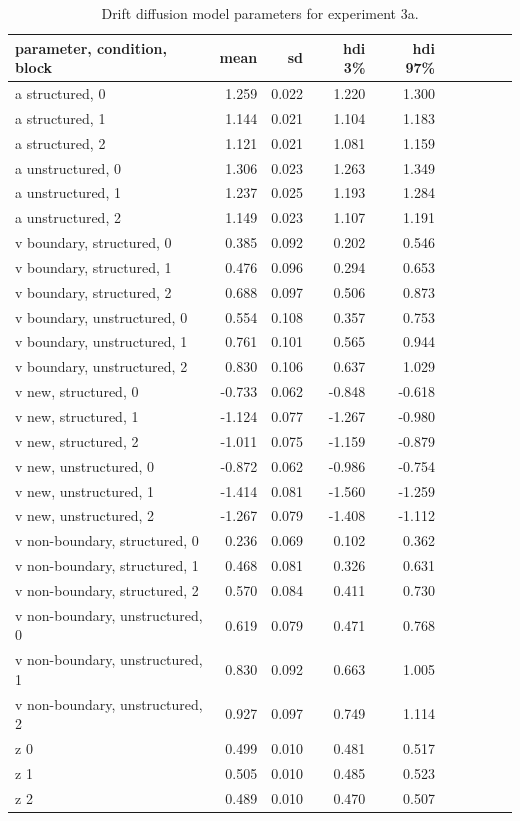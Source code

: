 \begin{table}[H]
    \centering
    \caption{Drift diffusion model parameters for experiment 3a.}
    \label{tab:exp3-ddm-params}
    \begin{tabular}{lrrrrrrrrr}
        \toprule
        parameter, condition, block & mean & sd & hdi 3\% & hdi 97\% \\
        \midrule
        a structured, 0 & 1.259 & 0.022 & 1.220 & 1.300 \\
        a structured, 1 & 1.144 & 0.021 & 1.104 & 1.183 \\
        a structured, 2 & 1.121 & 0.021 & 1.081 & 1.159 \\
        a unstructured, 0 & 1.306 & 0.023 & 1.263 & 1.349 \\
        a unstructured, 1 & 1.237 & 0.025 & 1.193 & 1.284 \\
        a unstructured, 2 & 1.149 & 0.023 & 1.107 & 1.191 \\
        v boundary, structured, 0 & 0.385 & 0.092 & 0.202 & 0.546 \\
        v boundary, structured, 1 & 0.476 & 0.096 & 0.294 & 0.653 \\
        v boundary, structured, 2 & 0.688 & 0.097 & 0.506 & 0.873 \\
        v boundary, unstructured, 0 & 0.554 & 0.108 & 0.357 & 0.753 \\
        v boundary, unstructured, 1 & 0.761 & 0.101 & 0.565 & 0.944 \\
        v boundary, unstructured, 2 & 0.830 & 0.106 & 0.637 & 1.029 \\
        v new, structured, 0 & -0.733 & 0.062 & -0.848 & -0.618 \\
        v new, structured, 1 & -1.124 & 0.077 & -1.267 & -0.980 \\
        v new, structured, 2 & -1.011 & 0.075 & -1.159 & -0.879 \\
        v new, unstructured, 0 & -0.872 & 0.062 & -0.986 & -0.754 \\
        v new, unstructured, 1 & -1.414 & 0.081 & -1.560 & -1.259 \\
        v new, unstructured, 2 & -1.267 & 0.079 & -1.408 & -1.112 \\
        v non-boundary, structured, 0 & 0.236 & 0.069 & 0.102 & 0.362 \\
        v non-boundary, structured, 1 & 0.468 & 0.081 & 0.326 & 0.631 \\
        v non-boundary, structured, 2 & 0.570 & 0.084 & 0.411 & 0.730 \\
        v non-boundary, unstructured, 0 & 0.619 & 0.079 & 0.471 & 0.768 \\
        v non-boundary, unstructured, 1 & 0.830 & 0.092 & 0.663 & 1.005 \\
        v non-boundary, unstructured, 2 & 0.927 & 0.097 & 0.749 & 1.114 \\
        z 0 & 0.499 & 0.010 & 0.481 & 0.517 \\
        z 1 & 0.505 & 0.010 & 0.485 & 0.523 \\
        z 2 & 0.489 & 0.010 & 0.470 & 0.507 \\
        \bottomrule
        \end{tabular}
        

\end{table}
